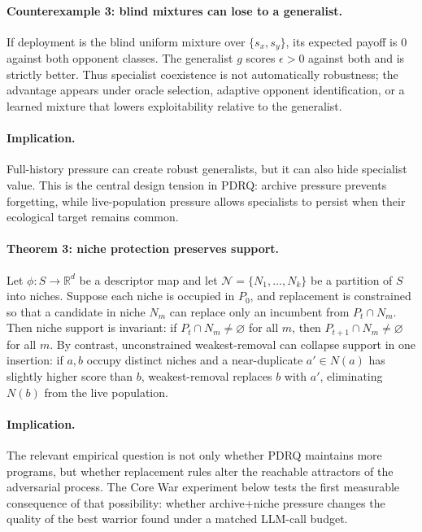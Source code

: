 \documentclass[11pt]{article}
\begin{document}
\paragraph{Counterexample 3: blind mixtures can lose to a generalist.}
If deployment is the blind uniform mixture over $\{s_x,s_y\}$, its expected payoff is $0$ against both opponent classes. The generalist $g$ scores $\epsilon>0$ against both and is strictly better. Thus specialist coexistence is not automatically robustness; the advantage appears under oracle selection, adaptive opponent identification, or a learned mixture that lowers exploitability relative to the generalist.

\paragraph{Implication.}
Full-history pressure can create robust generalists, but it can also hide specialist value. This is the central design tension in PDRQ: archive pressure prevents forgetting, while live-population pressure allows specialists to persist when their ecological target remains common.

\paragraph{Theorem 3: niche protection preserves support.}
Let $\phi:S\rightarrow\mathbb{R}^d$ be a descriptor map and let $\mathcal{N}=\{N_1,\ldots,N_k\}$ be a partition of $S$ into niches. Suppose each niche is occupied in $P_0$, and replacement is constrained so that a candidate in niche $N_m$ can replace only an incumbent from $P_t\cap N_m$. Then niche support is invariant: if $P_t\cap N_m\neq\varnothing$ for all $m$, then $P_{t+1}\cap N_m\neq\varnothing$ for all $m$. By contrast, unconstrained weakest-removal can collapse support in one insertion: if $a,b$ occupy distinct niches and a near-duplicate $a'\in N(a)$ has slightly higher score than $b$, weakest-removal replaces $b$ with $a'$, eliminating $N(b)$ from the live population.

\paragraph{Implication.}
The relevant empirical question is not only whether PDRQ maintains more programs, but whether replacement rules alter the reachable attractors of the adversarial process. The Core War experiment below tests the first measurable consequence of that possibility: whether archive+niche pressure changes the quality of the best warrior found under a matched LLM-call budget.
\end{document}
